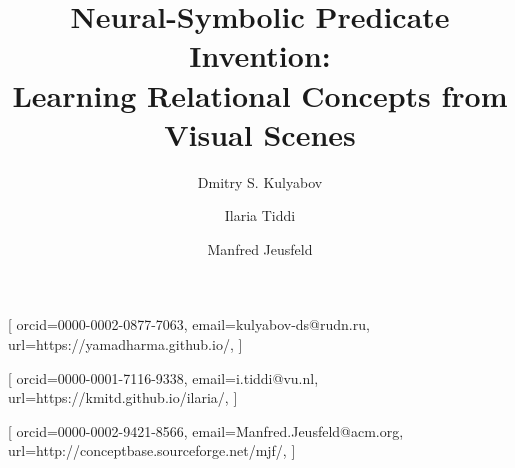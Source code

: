 \documentclass[
]{ceurart}
\begin{document}
	
	
	
	\title{Neural-Symbolic Predicate Invention: \\Learning Relational Concepts from Visual Scenes}
	
	
	\author[1,2]{Dmitry S. Kulyabov}[%
	orcid=0000-0002-0877-7063,
	email=kulyabov-ds@rudn.ru,
	url=https://yamadharma.github.io/,
	]
	\cormark[1]
	\fnmark[1]
	\address[1]{Peoples' Friendship University of Russia (RUDN University),
		6 Miklukho-Maklaya St, Moscow, 117198, Russian Federation}
	\address[2]{Joint Institute for Nuclear Research,
		6 Joliot-Curie, Dubna, Moscow region, 141980, Russian Federation}
	
	\author[3]{Ilaria Tiddi}[%
	orcid=0000-0001-7116-9338,
	email=i.tiddi@vu.nl,
	url=https://kmitd.github.io/ilaria/,
	]
	\fnmark[1]
	\address[3]{Vrije Universiteit Amsterdam, De Boelelaan 1105, 1081 HV Amsterdam, The Netherlands}
	
	\author[4]{Manfred Jeusfeld}[%
	orcid=0000-0002-9421-8566,
	email=Manfred.Jeusfeld@acm.org,
	url=http://conceptbase.sourceforge.net/mjf/,
	]
	\fnmark[1]
	\address[4]{University of Skövde, Högskolevägen 1, 541 28 Skövde, Sweden}
	
	
\end{document}
